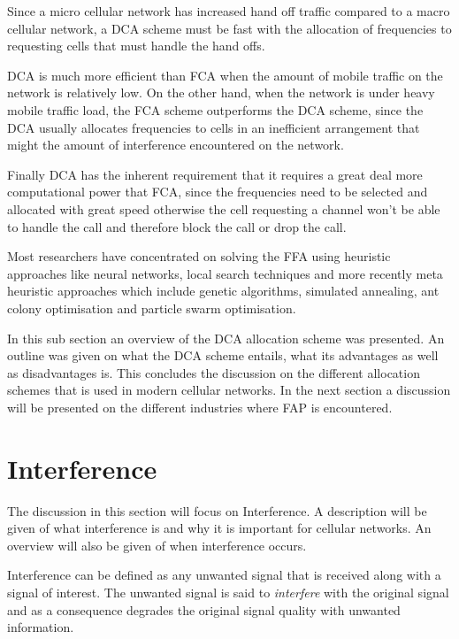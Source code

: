 Since a micro cellular network has increased hand off traffic compared to a macro cellular network, a DCA scheme must be fast with the allocation of frequencies to requesting cells that must handle the hand offs\cite{PrinciplesMobileCommunication,WirelessCommunications,MobileWirelessCommunications}.

DCA is much more efficient than FCA when the amount of mobile traffic on the network is relatively low. On the other hand, when the network is under heavy mobile traffic load, the FCA scheme outperforms the DCA scheme, since the DCA usually allocates frequencies to cells in an inefficient arrangement that might the amount of interference encountered on the network\cite{PrinciplesMobileCommunication,WirelessCommunications,MobileWirelessCommunications}.

Finally DCA has the inherent requirement that it requires a great deal more computational power that FCA, since the frequencies need to be selected and allocated with great speed otherwise the cell requesting a channel won't be able to handle the call and therefore block the call or drop the call\cite{PrinciplesMobileCommunication,WirelessCommunications,MobileWirelessCommunications}.

Most researchers have concentrated on solving the FFA using heuristic approaches like neural networks, local search techniques and more recently meta heuristic approaches which include genetic algorithms, simulated annealing, ant colony optimisation and particle swarm optimisation.

In this sub section an overview of the DCA allocation scheme was presented. An outline was given on what the DCA scheme entails, what its advantages as well as disadvantages is. This concludes the discussion on the different allocation schemes that is used in modern cellular networks. In the next section a discussion will be presented on the different industries where FAP is encountered.

\section{Interference}
\label{sec:Interference}
The discussion in this section will focus on Interference. A description will be given of what interference is and why it is important for cellular networks. An overview will also be given of when interference occurs.

Interference can be defined as any unwanted signal that is received along with a signal of interest. The unwanted signal is said to \emph{interfere} with the original signal and as a consequence degrades the original signal quality with unwanted information\cite{WirelessDigitalCommunications}.

